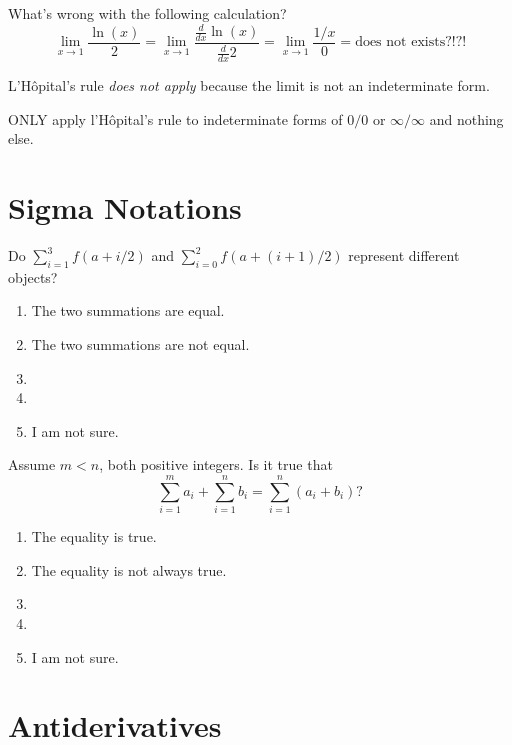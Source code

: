 \documentclass[14pt]{beamer}
\begin{document}
\begin{frame}
  What's wrong with the following calculation?
  \[
    \lim_{x \to 1} \frac{\ln(x)}{2} = \lim_{x \to 1} \frac{\frac{d}{dx} \ln(x)}{\frac{d}{dx} 2} = \lim_{x \to 1} \frac{1/x}{0} = \text{does not exists?!?!}
  \]

  \pause{} 

  L'H\^opital's rule \emph{does not apply} because the limit is not an indeterminate form.

  ONLY apply l'H\^opital's rule to indeterminate forms of \(0/0\) or \(\infty/\infty\) and nothing else.
\end{frame}

\section{Sigma Notations}

\begin{frame}[t]
Do \(\sum_{i=1}^{3} f(a + i/2)\) and \(\sum_{i=0}^{2} f(a + (i+1)/2)\) represent different objects?

  \medskip
  \begin{enumerate} \setlength\itemsep{1ex}
    \item The two summations are equal.
    \item The two summations are not equal.
    \item 
    \item 
    \item I am not sure.
  \end{enumerate} 
\end{frame}

\begin{frame}[t]
  Assume \(m < n\), both positive integers. Is it true that 
  \[
    \sum_{i=1}^{m} a_{i} + \sum_{i=1}^{n} b_{i} = \sum_{i=1}^{n} (a_{i}+ b_{i})?
  \]

  \medskip
  \begin{enumerate} \setlength\itemsep{1ex}
    \item The equality is true.
    \item The equality is not always true.
    \item 
    \item 
    \item I am not sure.
  \end{enumerate} 
\end{frame}

\section{Antiderivatives}
\end{document}
